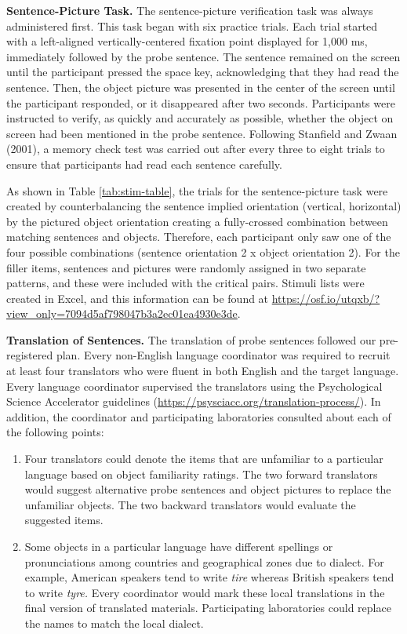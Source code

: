 \documentclass[
  man,mask,floatsintext]{apa7}
\begin{document}
\textbf{Sentence-Picture Task.} The sentence-picture verification task was
always administered first. This task began with six practice trials.
Each trial started with a left-aligned vertically-centered fixation
point displayed for 1,000 ms, immediately followed by the probe
sentence. The sentence remained on the screen until the participant
pressed the space key, acknowledging that they had read the sentence.
Then, the object picture was presented in the center of the screen until
the participant responded, or it disappeared after two seconds.
Participants were instructed to verify, as quickly and accurately as
possible, whether the object on screen had been mentioned in the probe
sentence. Following Stanfield and Zwaan (2001), a memory check test was
carried out after every three to eight trials to ensure that
participants had read each sentence carefully.

As shown in Table \ref{tab:stim-table}, the trials for the
sentence-picture task were created by counterbalancing the sentence
implied orientation (vertical, horizontal) by the pictured object
orientation creating a fully-crossed combination between matching
sentences and objects. Therefore, each participant only saw one of the
four possible combinations (sentence orientation 2 x object orientation
2). For the filler items, sentences and pictures were randomly assigned
in two separate patterns, and these were included with the critical
pairs. Stimuli lists were created in Excel, and this information can be
found at \url{https://osf.io/utqxb/?view_only=7094d5af798047b3a2ec01ea4930e3de}.

\textbf{Translation of Sentences.} The translation of probe sentences
followed our pre-registered plan. Every non-English language coordinator
was required to recruit at least four translators who were fluent in
both English and the target language. Every language coordinator
supervised the translators using the Psychological Science Accelerator
guidelines (\url{https://psysciacc.org/translation-process/}). In addition,
the coordinator and participating laboratories consulted about each of
the following points:

\begin{enumerate}
\def\labelenumi{\arabic{enumi})}
\item
  Four translators could denote the items that are unfamiliar to a
  particular language based on object familiarity ratings. The two
  forward translators would suggest alternative probe sentences and
  object pictures to replace the unfamiliar objects. The two backward
  translators would evaluate the suggested items.
\item
  Some objects in a particular language have different spellings or
  pronunciations among countries and geographical zones due to
  dialect. For example, American speakers tend to write \emph{tire} whereas
  British speakers tend to write \emph{tyre.} Every coordinator would mark
  these local translations in the final version of translated
  materials. Participating laboratories could replace the names to
  match the local dialect.
\end{enumerate}
\end{document}
